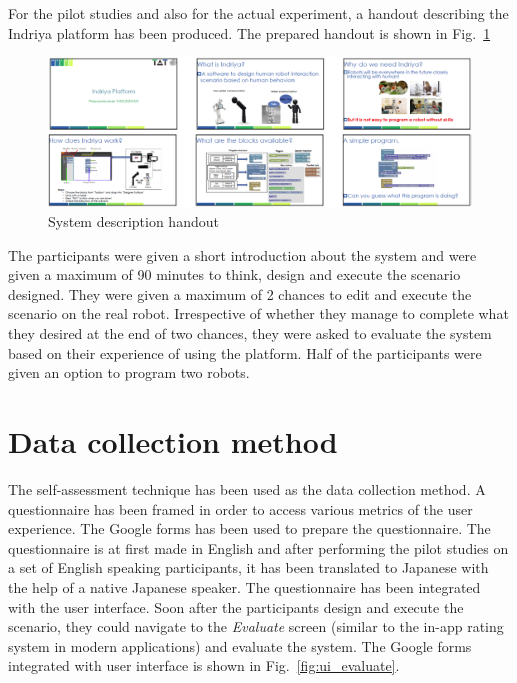 For the pilot studies and also for the actual experiment, a handout describing the Indriya platform has been produced. The prepared handout is shown in Fig.~\ref{fig:handout}
\begin{figure}[H]
\centering
\includegraphics[width=\textwidth]{../thesis/assets/handout.png}
\caption[System description handout]{System description handout}
\label{fig:handout}
\end{figure}

The participants were given a short introduction about the system and were given a maximum of 90 minutes to think, design and execute the scenario designed. They were given a maximum of 2 chances to edit and execute the scenario on the real robot. Irrespective of whether they manage to complete what they desired at the end of two chances, they were asked to evaluate the system based on their experience of using the platform. Half of the participants were given an option to program two robots.

\section{Data collection method}
The self-assessment \cite{bethel2010review} technique has been used as the data collection method. A questionnaire has been framed in order to access various metrics of the user experience. The Google forms has been used to prepare the questionnaire. The questionnaire is at first made in English and after performing the pilot studies on a set of English speaking participants, it has been translated to Japanese with the help of a native Japanese speaker. The questionnaire has been integrated with the user interface. Soon after the participants design and execute the scenario, they could navigate to the \emph{Evaluate} screen (similar to the in-app rating system in modern applications) and evaluate the system. The Google forms integrated with user interface is shown in Fig.~\ref{fig:ui_evaluate}. 

